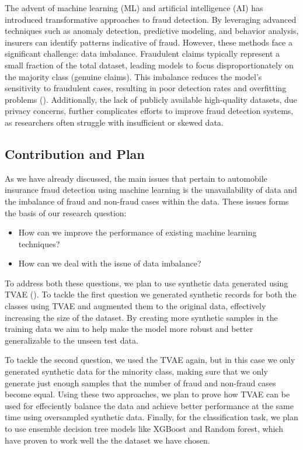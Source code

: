 \documentclass[twoside,11pt]{article}
\begin{document}
\begin{keywords}
The advent of machine learning (ML) and artificial intelligence (AI) has introduced transformative approaches to fraud detection. By leveraging advanced techniques such as anomaly detection, predictive modeling, and behavior analysis, insurers can identify patterns indicative of fraud. However, these methods face a significant challenge: data imbalance. Fraudulent claims typically represent a small fraction of the total dataset, leading models to focus disproportionately on the majority class (genuine claims). This imbalance reduces the model's sensitivity to fraudulent cases, resulting in poor detection rates and overfitting problems (\citealp{phuaComprehensiveSurveyData2012}). Additionally, the lack of publicly available high-quality datasets, due privacy concerns, further complicates efforts to improve fraud detection systems, as researchers often struggle with insufficient or skewed data.

\subsection{Contribution and Plan}

As we have already discussed, the main issues that pertain to automobile insurance fraud detection using machine learning is the unavailability of data and the imbalance of fraud and non-fraud cases within the data. These issues forms the basis of our research question:

\begin{itemize}
    \item How can we improve the performance of existing machine learning techniques?
    \item How can we deal with the issue of data imbalance?
\end{itemize}

To address both these questions, we plan to use synthetic data generated using TVAE (\citealp{XuRp}). To tackle the first question we generated synthetic records for both the classes using TVAE and augmented them to the original data, effectively increasing the size of the dataset. By creating more synthetic samples in the training data we aim to help make the model more robust and better generalizable to the unseen test data.

To tackle the second question, we used the TVAE again, but in this case we only generated synthetic data for the minority class, making sure that we only generate just enough samples that the number of fraud and non-fraud cases become equal. Using these two approaches, we plan to prove how TVAE can be used for effeciently balance the data and achieve better performance at the same time using oversampled synthetic data. Finally, for the classification task, we plan to use ensemble decision tree models like XGBoost and Random forest, which have proven to work well the the dataset we have chosen.


\end{keywords}
\end{document}
